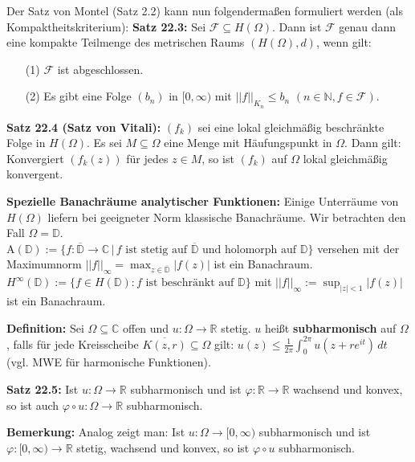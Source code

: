 \documentclass[11pt]{article}
\newcommand{\C}{\mathbb{C}}
\newcommand{\R}{\mathbb{R}}
\newcommand{\N}{\mathbb{N}}
\newcommand{\D}{\mathbb{D}}
\begin{document}
\newpage
Der Satz von Montel (Satz 2.2) kann nun folgendermaßen formuliert werden (als Kompaktheitskriterium):
\textbf{Satz 22.3:} Sei $\mathcal{F} \subseteq H(\Omega)$. Dann ist $\mathcal{F}$ genau dann eine kompakte Teilmenge des metrischen Raums $(H(\Omega),d)$, wenn gilt:
\vspace{-0.6cm}
\begin{itemize}
\item[(1)] $\mathcal{F}$ ist abgeschlossen. \vspace{-0.2cm}
\item[(2)] Es gibt eine Folge $(b_n)$ in $[0,\infty)$ mit $||f||_{K_n} \leq b_n$ $(n \in \N, f \in \mathcal{F})$.
\end{itemize}
\vspace{-0.3cm}

\textbf{Satz 22.4 (Satz von Vitali):} $(f_k)$ sei eine lokal gleichmäßig beschränkte Folge in $H(\Omega)$. Es sei $M \subseteq \Omega$ eine Menge mit Häufungspunkt in $\Omega$. Dann gilt: Konvergiert $(f_k(z))$ für jedes $z \in M$, so ist $(f_k)$ auf $\Omega$ lokal gleichmäßig konvergent.

\textbf{Spezielle Banachräume analytischer Funktionen:} Einige Unterräume von $H(\Omega)$ liefern bei geeigneter Norm klassische Banachräume. Wir betrachten den Fall $\Omega = \D$. \\
A$(\D) := \{ f \colon \overline{\D} \to \C \,|\, f \text{ ist stetig auf } \overline{\D} \text{ und holomorph auf } \D \}$ versehen mit der Maximumnorm $||f||_{\infty} = \max_{z \in \overline{\D}} |f(z)|$ ist ein Banachraum. \\
$H^\infty (\D) := \{ f \in H(\D) \colon f \text{ ist beschränkt auf } \D \}$ mit $||f||_\infty := \sup_{|z| < 1} |f(z)|$ ist ein Banachraum.

\textbf{Definition:} Sei $\Omega \subseteq \C$ offen und $u \colon \Omega \to \R$ stetig. $u$ heißt \textbf{subharmonisch} auf $\Omega$, falls für jede Kreisscheibe $\overline{K(z,r)} \subseteq \Omega$ gilt: $u(z) \leq \frac{1}{2\pi} \int_0^{2\pi} u(z + re^{it}) \, dt$ (vgl. MWE für harmonische Funktionen).

\textbf{Satz 22.5:} Ist $u \colon \Omega \to \R$ subharmonisch und ist $\varphi \colon \R \to \R$ wachsend und konvex, so ist auch $\varphi \circ u \colon \Omega \to \R$ subharmonisch. 

\textbf{Bemerkung:} Analog zeigt man: Ist $u\colon \Omega \to [0,\infty)$ subharmonisch und ist $\varphi \colon [0,\infty) \to \R$ stetig, wachsend und konvex, so ist $\varphi \circ u$ subharmonisch.
\end{document}
